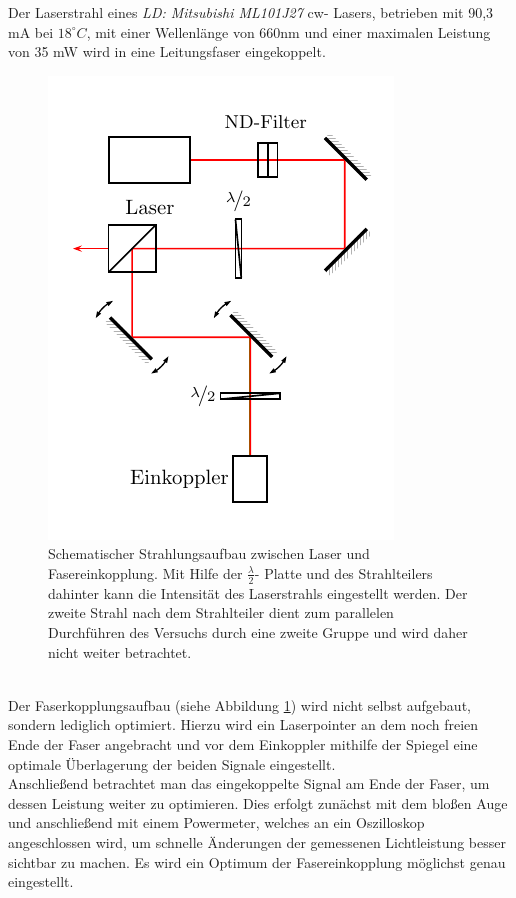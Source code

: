 
Der Laserstrahl eines \textit{LD: Mitsubishi ML101J27} cw- Lasers, betrieben mit 90,3 mA bei $18^\circ C$, mit einer Wellenlänge von 660nm und einer maximalen Leistung von 35 mW wird in eine Leitungsfaser eingekoppelt. \\

\begin{figure} [h]
\centering
\includegraphics[width=0.5\linewidth]{graphs/versuchsaufbau/lasereinheit}
\caption{Schematischer Strahlungsaufbau zwischen Laser und Fasereinkopplung. Mit Hilfe der $\frac{\lambda}{2}$- Platte und des Strahlteilers dahinter kann die Intensität des Laserstrahls eingestellt werden. Der zweite Strahl nach dem Strahlteiler dient zum parallelen Durchführen des Versuchs durch eine zweite Gruppe und wird daher nicht weiter betrachtet.}
\label{fig:lasereinheit}
\end{figure}
\\
Der Faserkopplungsaufbau (siehe Abbildung \ref{fig:lasereinheit}) wird nicht selbst aufgebaut, sondern lediglich optimiert. Hierzu wird ein Laserpointer an dem noch freien Ende der Faser angebracht und vor dem Einkoppler mithilfe der Spiegel eine optimale Überlagerung der beiden Signale eingestellt. \\
Anschließend betrachtet man das eingekoppelte Signal am Ende der Faser, um dessen Leistung weiter zu optimieren. Dies erfolgt zunächst mit dem bloßen Auge und anschließend mit einem Powermeter, welches an ein Oszilloskop angeschlossen wird, um schnelle Änderungen der gemessenen Lichtleistung besser sichtbar zu machen. Es wird ein Optimum der Fasereinkopplung möglichst genau eingestellt. 



